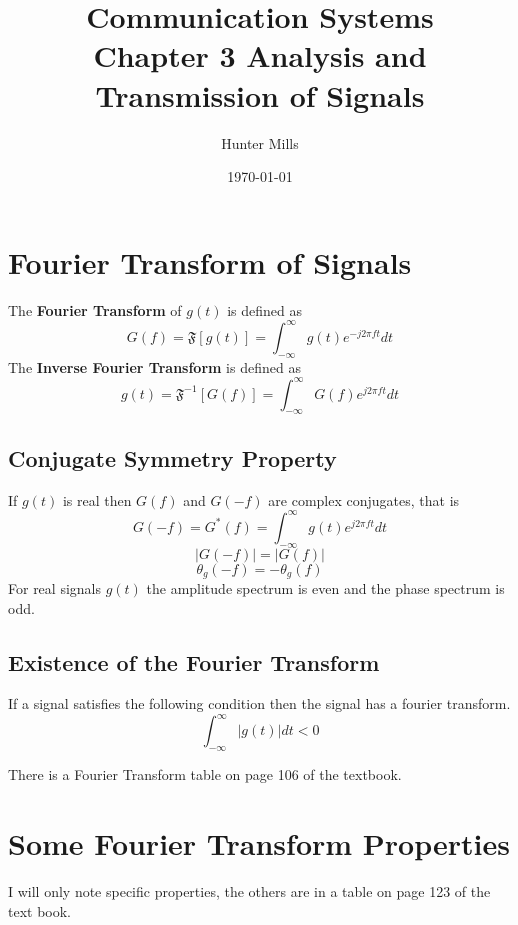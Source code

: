 \documentclass{article}
\title{Communication Systems \\
    \large Chapter 3 Analysis and Transmission of Signals}
\author{Hunter Mills}
\date{\today}
\begin{document}
    \maketitle

    \medskip
    
    \section{Fourier Transform of Signals}
    The \textbf{Fourier Transform} of $g(t)$ is defined as
    \begin{equation}
        G(f) = \mathfrak{F} [g(t)] = \int_{-\infty}^{\infty}g(t)e^{-j2\pi ft}dt
    \end{equation}
    The \textbf{Inverse Fourier Transform} is defined as
    \begin{equation}
        g(t) = \mathfrak{F}^{-1} [G(f)] = \int_{-\infty}^{\infty}G(f)e^{j2\pi ft}dt
    \end{equation}

    \subsection{Conjugate Symmetry Property}
    If $g(t)$ is real then $G(f)$ and $G(-f)$ are complex conjugates, that is
    \begin{equation}
        G(-f) = G^*(f) = \int_{-\infty}^{\infty}g(t)e^{j2\pi ft}dt
    \end{equation}
    \begin{equation}
        |G(-f)| = |G(f)|
    \end{equation}
    \begin{equation}
        \theta_g(-f) = -\theta_g(f)
    \end{equation}
    For real signals $g(t)$ the amplitude spectrum is even and the phase spectrum is odd. 

    \subsection{Existence of the Fourier Transform}
    If a signal satisfies the following condition then the signal has a fourier transform.
    \begin{equation}
        \int_{-\infty}^{\infty}|g(t)|dt < 0
    \end{equation}

    There is a Fourier Transform table on page 106 of the textbook.

    \section{Some Fourier Transform Properties}
    I will only note specific properties, the others are in a table on page 123 of the text book.
\end{document}
